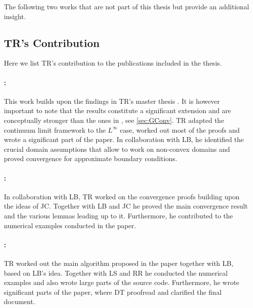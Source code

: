 \printbibliography[keyword={papersA}, resetnumbers=true, heading=none]
\printbibliography[keyword={papersB}, resetnumbers=true, heading=none]

\noindent%
The following two works that are not part of this thesis but provide an additional insight.

\printbibliography[keyword={papersC}, resetnumbers=true, heading=none]

\subsection*{TR's Contribution}

Here we list TR's contribution to the publications included in the thesis.

\paragraph{\cite{roith2022continuum}:} This work builds upon the findings in TR's master thesis \cite{roith2022msc}. It is however important to note that the results constitute a significant extension and are conceptually stronger than the ones in \cite{roith2022msc}, see \cref{sec:GConv}. TR adapted the continuum limit framework to the $L^\infty$ case, worked out most of the proofs and wrote a significant part of the paper. In collaboration with LB, he identified the crucial domain assumptions that allow to work on non-convex domains and proved convergence for approximate boundary conditions.

\paragraph{\cite{bungert2021uniform}:} In collaboration with LB, TR worked on the convergence proofs building upon the ideas of JC. Together with LB and JC he proved the main convergence result and the various lemmas leading up to it. Furthermore, he contributed to the numerical examples conducted in the paper. 

\paragraph{\cite{bungert2021clip}:} TR worked out the main algorithm proposed in the paper together with LB, based on LB's idea. Together with LS and RR he conducted the numerical examples and also wrote large parts of the source code. Furthermore, he wrote significant parts of the paper, where DT proofread and clarified the final document.

